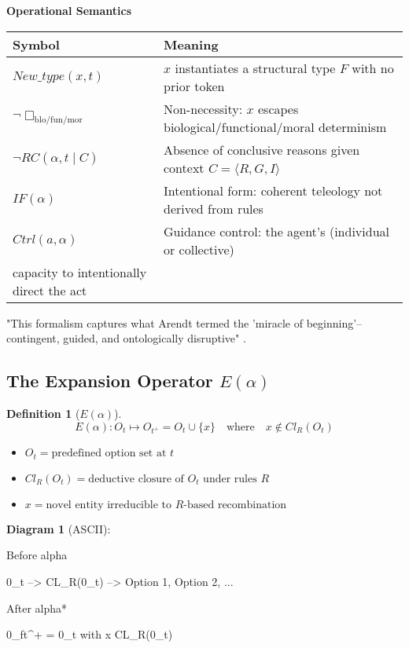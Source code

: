 \documentclass[11pt,a4paper]{article}
\newtheorem{definition}{Definition}
\begin{document}
\textbf{Operational Semantics}

\begin{tabular}{l l}
\textbf{Symbol} & \textbf{Meaning} \\ \hline
\(New\_type(x,t)\) & \(x\) instantiates a structural type \(F\) with no prior token \\
\(\neg\Box_{\text{blo/fun/mor}}\) & Non-necessity: \(x\) escapes biological/functional/moral determinism \\
\(\neg RC(\alpha,t\mid C)\) & Absence of conclusive reasons given context \(C=\langle R,G,I\rangle\) \\
\(IF(\alpha)\) & Intentional form: coherent teleology not derived from rules \\
\(\textit{Ctrl}(a,\alpha)\) & Guidance control:  the agent's (individual or collective) \\ capacity to intentionally direct the act \\
\end{tabular}

"This formalism captures what Arendt termed the 'miracle of beginning'--contingent, guided, and ontologically disruptive" \cite[ p. 178]{arendt1958}.

\subsection{The Expansion Operator \(E(\alpha)\)}\label{sec:model-expansion}

\begin{definition}[\(E(\alpha)\)]
\[
E(\alpha):O_{t}\mapsto O_{t^{+}}=O_{t}\cup\{x\}\quad\text{where}\quad x\notin Cl _{R}(O_{t})
\]
\end{definition}

\begin{itemize}
  \item \(O_{t}=\text{predefined option set at }t\)
  \item \(Cl_{R}(O_{t})=\text{deductive closure of }O_{t}\text{ under rules }R\)
  \item \(x=\text{novel entity irreducible to }R\text{-based recombination}\)
\end{itemize}

\textbf{Diagram 1} (ASCII):

Before alpha

  0_t --> CL_R(0_t) --> Option 1, Option 2, ...

After alpha*

  0_f{t^+} = 0_t  with x \nothing CL_R(0_t)
\end{document}
